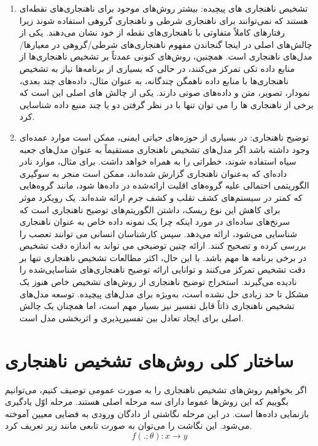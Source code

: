 \documentclass[12pt,a4paper]{report}
\theoremstyle{definition}
\theoremstyle{definition}
\begin{document}
\begin{enumerate}
{}

\item{
تشخیص ناهنجاری های پیچیده:
بیشتر روش‌های موجود برای ناهنجاری‌های نقطه‌ای هستند که نمی‌توانند برای ناهنجاری شرطی و ناهنجاری گروهی استفاده شوند زیرا رفتارهای کاملاً متفاوتی با ناهنجاری‌های نقطه از خود نشان می‌دهند. یکی از چالش‌های اصلی در اینجا گنجاندن مفهوم ناهنجاری‌های شرطی/گروهی در معیارها/مدل‌های ناهنجاری است. همچنین، روش‌های کنونی عمدتاً بر تشخیص ناهنجاری‌ها از منابع داده تکی تمرکز می‌کنند، در حالی که بسیاری از برنامه‌ها نیاز به تشخیص ناهنجاری‌ها با منابع داده ناهمگن چندگانه، به عنوان مثال، داده‌های چند بعدی، نمودار، تصویر، متن و داده‌های صوتی دارند. یکی از چالش های اصلی این است که برخی از ناهنجاری ها را می توان تنها با در نظر گرفتن دو یا چند منبع داده شناسایی کرد.
}

\item {
	توضیح ناهنجاری:
در بسیاری از حوزه‌های حیاتی ایمنی، ممکن است موارد عمده‌ای وجود داشته باشد اگر مدل‌های تشخیص ناهنجاری مستقیماً به عنوان مدل‌های جعبه سیاه استفاده شوند، خطراتی را به همراه خواهد داشت. برای مثال، موارد نادر داده‌ای که به‌عنوان ناهنجاری گزارش شده‌اند، ممکن است منجر به سوگیری الگوریتمی احتمالی علیه گروه‌های اقلیت ارائه‌شده در داده‌ها شود، مانند گروه‌هایی که کمتر در سیستم‌های کشف تقلب و کشف جرم ارائه شده‌اند. یک رویکرد موثر برای کاهش این نوع ریسک، داشتن الگوریتم‌های توضیح ناهنجاری است که سرنخ‌های ساده‌ای در مورد اینکه چرا یک نمونه داده خاص به عنوان ناهنجاری شناسایی می‌شود، ارائه می‌دهد. سپس کارشناسان انسانی می توانند تعصب را بررسی کرده و تصحیح کنند. ارائه چنین توضیحی می تواند به اندازه دقت تشخیص در برخی برنامه ها مهم باشد. با این حال، اکثر مطالعات تشخیص ناهنجاری تنها بر دقت تشخیص تمرکز می‌کنند و توانایی ارائه توضیح ناهنجاری‌های شناسایی‌شده را نادیده می‌گیرند. استخراج توضیح ناهنجاری از روش‌های تشخیص خاص هنوز یک مشکل تا حد زیادی حل نشده است، به‌ویژه برای مدل‌های پیچیده. توسعه مدل‌های تشخیص ناهنجاری ذاتاً قابل تفسیر نیز بسیار مهم است، اما همچنان یک چالش اصلی برای ایجاد تعادل بین تفسیرپذیری و اثربخشی مدل است.
}
\end{enumerate}
\section{ساختار کلی روش‌های تشخیص ناهنجاری}

	اگر بخواهیم روش‌های تشخیص ناهنجاری را به صورت عمومی توصیف کنیم، می‌توانیم بگوییم که این روش‌ها عموما دارای سه مرحله اصلی هستند. مرحله اوّل یادگیری بازنمایی داد‌ه‌ها است. در این مرحله نگاشتی از دادگان ورودی به فضایی معیین آموخته می‌شود. این نگاشت را می‌توان به صورت تابعی مانند زیر تعریف کرد.
\begin{equation}
f(.;\theta): x \rightarrow y
\end{equation}
	
\end{document}
